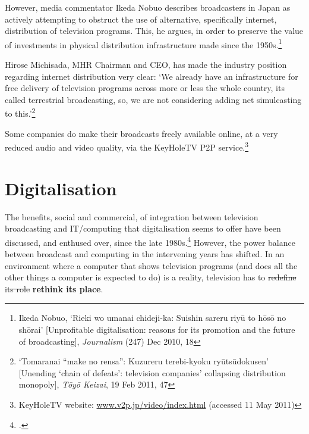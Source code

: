 \documentclass[11pt, oneside, a4paper, headsepline]{scrartcl}
\newcommand{\citej}[2] {\footcite[\nopp #1]{#2} }
\newcommand{\TYKZ}{\emph{T\={o}y\={o} Keizai}}
\begin{document}
However, media commentator Ikeda Nobuo describes broadcasters in Japan as actively attempting to obstruct the use of alternative, specifically internet, distribution of television programs. This, he argues, in order to preserve the value of investments in physical distribution infrastructure made since the 1950s.\footnote{Ikeda Nobuo, `Rieki wo umanai chideji-ka: Suishin sareru riy\={u} to h\={o}s\={o} no sh\={o}rai' [Unprofitable digitalisation: reasons for its promotion and the future of broadcasting], \emph{Journalism} (247) Dec 2010, 18\label{ikeda}} 

Hirose Michisada, MHR Chairman and CEO, has made the industry position regarding internet distribution very clear: `We already have an infrastructure for free delivery of television programs across more or less the whole country, its called terrestrial broadcasting, so, we are not considering adding net simulcasting to this.'\footnote{`Tomaranai ``make no rensa'': Kuzureru terebi-kyoku ry\={u}ts\={u}dokusen' [Unending `chain of defeats': television companies' collapsing distribution monopoly], \TYKZ, 19 Feb 2011, 47\label{note:rensa}}

Some companies do make their broadcasts freely available online, at a very reduced audio and video quality, via the KeyHoleTV P2P service.\footnote{KeyHoleTV website: \url{www.v2p.jp/video/index.html} (accessed 11 May 2011)}  

\section{Digitalisation}
\label{digitalisation}

The benefits, social and commercial, of integration between television broadcasting and IT/computing that digitalisation seems to offer have been discussed, and enthused over, since the late 1980s.\citej{Sec.\,2}{Brinkley:1997} However, the power balance between broadcast and computing in the intervening years has shifted. In an environment where a computer that shows television programs (and does all the other things a computer is expected to do) is a reality, television has to \st{redefine its role} \textbf{rethink its place}. 

\end{document}
